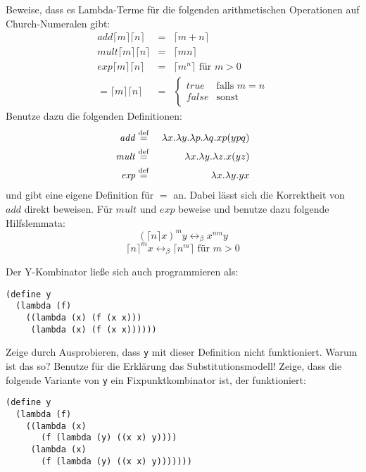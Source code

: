 \begin{aufgabe}\label{ex:church}
  Beweise, dass es Lambda-Terme für die folgenden arithmetischen
  Operationen auf Church-Numeralen gibt:
  \begin{eqnarray*}
    \mathit{add} \lceil m\rceil \lceil n\rceil &=& \lceil m+n\rceil
    \\
    \mathit{mult} \lceil m\rceil \lceil n\rceil &=& \lceil mn\rceil
    \\
    \mathit{exp} \lceil m\rceil \lceil n\rceil &=& \lceil m^n\rceil
    \textrm{ für } m>0\\
    \mathit{=}\lceil m\rceil \lceil n\rceil &=&
    \begin{cases}
      \mathit{true} & \text{falls } m = n\\
      \mathit{false} & \text{sonst}
    \end{cases}
  \end{eqnarray*}
  Benutze dazu die folgenden Definitionen:
  \begin{eqnarray*}
    \mathit{add} &\stackrel{\rm def}{=}{}& \lambda x.\lambda y.\lambda p.\lambda q.xp(ypq)\\
    \mathit{mult} &\stackrel{\rm def}{=}{}& \lambda x.\lambda y.\lambda z.x(yz)\\
    \mathit{exp} &\stackrel{\rm def}{=}{}& \lambda x.\lambda y.y x
  \end{eqnarray*}
  und gibt eine eigene Definition für $=$ an.
  Dabei lässt sich die Korrektheit von $\mathit{add}$ direkt beweisen.
  Für $\mathit{mult}$ und $\mathit{exp}$ beweise und benutze dazu
  folgende Hilfslemmata:
  \begin{displaymath}
    (\lceil n\rceil x)^m y \leftrightarrow_{\beta} x^{nm} y
  \end{displaymath}
  \begin{displaymath}
    \label{eq:lem-2}
    \lceil n\rceil^m x \leftrightarrow_{\beta} \lceil n^m\rceil
    \textrm{ für } m>0
  \end{displaymath}
\end{aufgabe}
\begin{aufgabe}
  Der Y-Kombinator ließe sich auch programmieren
  als:
\begin{verbatim}
(define y 
  (lambda (f)
    ((lambda (x) (f (x x)))
     (lambda (x) (f (x x))))))
\end{verbatim}
  Zeige durch Ausprobieren, dass \texttt{y} mit dieser Definition 
  nicht funktioniert.  Warum ist das so?  Benutze für die
  Erklärung das Substitutionsmodell!
  Zeige, dass die folgende Variante von \texttt{y} ein
  Fixpunktkombinator ist, der funktioniert:
\begin{verbatim}
(define y
  (lambda (f)
    ((lambda (x)
       (f (lambda (y) ((x x) y))))
     (lambda (x)
       (f (lambda (y) ((x x) y)))))))
\end{verbatim}

\end{aufgabe}
